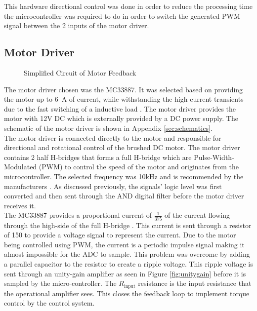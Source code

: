  This hardware directional control was done in order to reduce the processing time the microcontroller was required to do in order to switch the generated PWM signal between the 2 inputs of the motor driver.

\subsection{Motor Driver}
\begin{figure}[h]
	\centering
	
	\caption{Simplified Circuit of Motor Feedback}
	\label{fig:feedback_current}
\end{figure}


The motor driver chosen was the MC33887. It was selected based on providing the motor up to \SI{6}{\ampere} of current, while withstanding the high current transients due to the fast switching of a inductive load \citep{motorIC}. The motor driver provides the motor with 12V DC which is externally provided by a DC power supply. The schematic of the motor driver is shown in Appendix \ref{sec:schematics}.\\

The motor driver is connected directly to the motor and responsible for directional and rotational control of the brushed DC motor. The motor driver contains 2 half H-bridges that forms a full H-bridge which are Pulse-Width-Modulated (PWM) to control the speed of the motor and originates from the microcontroller. The selected frequency was 10kHz and is recommended by the manufacturers \citep{motorIC}. As discussed previously, the signals' logic level was first converted and then sent through the AND digital filter before the motor driver receives it.\\

The MC33887 provides a proportional current of $\frac{1}{375}$ of the current flowing through the high-side of the full H-bridge \citep{motorIC}. This current is sent through a resistor of \SI{150}{\Omega} to provide a voltage signal to represent the current. Due to the motor being controlled using PWM, the current is a periodic impulse signal making it almost impossible for the ADC to sample. This problem was overcome by adding a parallel capacitor to the resistor to create a ripple voltage. This ripple voltage is sent through an unity-gain amplifier as seen in Figure \ref{fig:unitygain} before it is sampled by the micro-controller. The $R_{\text{input}}$ resistance is the input resistance that the operational amplifier sees. This closes the feedback loop to implement torque control by the control system.\\

